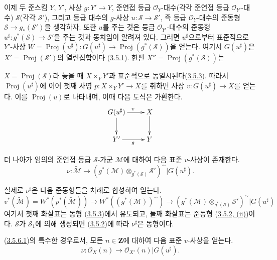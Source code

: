 \begin{env}[3.5.6]
\label{II.3.5.6-ko}
이제 두 준스킴 $Y$, $Y'$, 사상
$g:Y'\to Y$, 준연접 등급 $\mathcal{O}_Y$-대수(각각 준연접 등급
$\mathcal{O}_{Y'}$-대수) $\mathcal{S}$(각각 $\mathcal{S}'$), 그리고
등급 대수의 $g$-사상 $u:\mathcal{S}\to\mathcal{S}'$, 즉 등급
$\mathcal{O}_Y$-대수의 준동형
$\mathcal{S}\to g_*(\mathcal{S}')$을 생각하자. 또한 $u$를 주는 것은 등급
$\mathcal{O}_{Y'}$-대수의 준동형
$u^\sharp:g^*(\mathcal{S})\to\mathcal{S}'$을 주는 것과 동치임이 알려져 있다.
그러면 $u^\sharp$으로부터 표준적으로 $Y'$-사상
$W=\operatorname{Proj}(u^\sharp):G(u^\sharp)\to
\operatorname{Proj}(g^*(\mathcal{S}))$을 얻는다. 여기서 $G(u^\sharp)$은
$X'=\operatorname{Proj}(\mathcal{S}')$의 열린집합이다
(\hyperref[II.3.5.1-ko]{3.5.1}). 한편
$X''=\operatorname{Proj}(g^*(\mathcal{S}))$는


$X=\operatorname{Proj}(\mathcal{S})$라 놓을 때 $X\times_Y Y'$과 표준적으로
동일시된다(\hyperref[II.3.5.3-ko]{3.5.3}). 따라서
$\operatorname{Proj}(u^\sharp)$에 이어 첫째 사영
$p:X\times_Y Y'\to X$를 취하면 사상
$v:G(u^\sharp)\to X$를 얻는다. 이를 $\operatorname{Proj}(u)$로 나타내며,
이때 다음 도식은 가환한다.
\[
  \xymatrix{
    G(u^\sharp)\ar[r]^{v}\ar[d]
    & X\ar[d]\\
    Y'\ar[r]_{g}
    & Y
  }
\]

더 나아가 임의의 준연접 등급 $\mathcal{S}$-가군 $\mathcal{M}$에 대하여
다음 표준 $v$-사상이 존재한다.
\[
\label{II.3.5.6.1-ko}
  \nu:\widetilde{\mathcal{M}}\longrightarrow
  (g^*(\mathcal{M})\otimes_{g^*(\mathcal{S})}\mathcal{S}')^{\sim}
  |G(u^\sharp).
\tag{3.5.6.1}
\]

실제로 $\nu^\sharp$은 다음 준동형들을 차례로 합성하여 얻는다.
\[
  v^*(\widetilde{\mathcal{M}})
  =W^*(p^*(\widetilde{\mathcal{M}}))
  \longrightarrow W^*((g^*(\mathcal{M}))^{\sim})
  \longrightarrow
  (g^*(\mathcal{M})\otimes_{g^*(\mathcal{S})}\mathcal{S}')^{\sim}
  |G(u^\sharp)
\]
여기서 첫째 화살표는 동형
(\hyperref[II.3.5.3-ko]{3.5.3})에서 유도되고, 둘째 화살표는 준동형
(\hyperref[II.3.5.2-ko]{3.5.2, (ii)})이다. $\mathcal{S}$가
$\mathcal{S}_1$에 의해 생성되면 (\hyperref[II.3.5.2-ko]{3.5.2})에 따라
$\nu^\sharp$은 동형이다.

(\hyperref[II.3.5.6.1-ko]{3.5.6.1})의 특수한 경우로서, 모든
$n\in\mathbf{Z}$에 대하여 다음 표준 $v$-사상을 얻는다.
\[
\label{II.3.5.6.2-ko}
  \nu:\mathcal{O}_X(n)\longrightarrow
  \mathcal{O}_{X'}(n)|G(u^\sharp).
\tag{3.5.6.2}
\]
\end{env}

